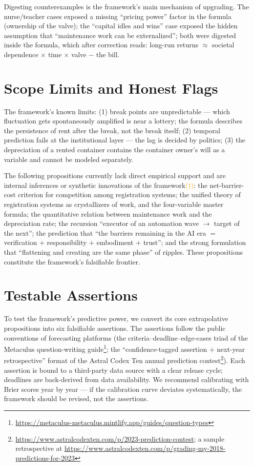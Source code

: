 \documentclass[11pt]{article}
\newcommand{\infmark}{\textcolor{orange}{(\(\dagger\))}}
\begin{document}
Digesting counterexamples is the framework's main mechanism of upgrading. The nurse/teacher cases exposed a missing ``pricing power'' factor in the formula (ownership of the valve); the ``capital idles and wins'' case exposed the hidden assumption that ``maintenance work can be externalized''; both were digested inside the formula, which after correction reads: long-run returns $\approx$ societal dependence $\times$ time $\times$ valve $-$ the bill.

\section{Scope Limits and Honest Flags}
The framework's known limits: (1) break points are unpredictable --- which fluctuation gets spontaneously amplified is near a lottery; the formula describes the persistence of rent after the break, not the break itself; (2) temporal prediction fails at the institutional layer --- the lag is decided by politics; (3) the depreciation of a rented container contains the container owner's will as a variable and cannot be modeled separately.

The following propositions currently lack direct empirical support and are internal inferences or synthetic innovations of the framework\infmark: the net-barrier-cost criterion for competition among registration systems; the unified theory of registration systems as crystallizers of work, and the four-variable master formula; the quantitative relation between maintenance work and the depreciation rate; the recursion ``executor of an automation wave $\to$ target of the next''; the prediction that ``the barriers remaining in the AI era $=$ verification $+$ responsibility $+$ embodiment $+$ trust''; and the strong formulation that ``flattening and creating are the same phase'' of ripples. These propositions constitute the framework's falsifiable frontier.

\section{Testable Assertions}
To test the framework's predictive power, we convert its core extrapolative propositions into six falsifiable assertions. The assertions follow the public conventions of forecasting platforms (the criteria--deadline--edge-cases triad of the Metaculus question-writing guide\footnote{\url{https://metaculus-metaculus.mintlify.app/guides/question-types}}; the ``confidence-tagged assertion $+$ next-year retrospective'' format of the Astral Codex Ten annual prediction contest\footnote{\url{https://www.astralcodexten.com/p/2023-prediction-contest}; a sample retrospective at \url{https://www.astralcodexten.com/p/grading-my-2018-predictions-for-2023}}). Each assertion is bound to a third-party data source with a clear release cycle; deadlines are back-derived from data availability. We recommend calibrating with Brier scores year by year --- if the calibration curve deviates systematically, the framework should be revised, not the assertions.
\end{document}
